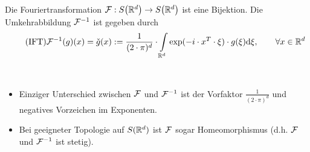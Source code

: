 \begin{theorem}\label{theorem7.4InversionDerFourierTransformation}\enter
	Die Fouriertransformation $\mathcal{F}:S\big(\mathbb{R}^d\big)\to S\big(\mathbb{R}^d\big)$ ist eine Bijektion. Die Umkehrabbildung $\mathcal{F}^{-1}$ ist gegeben durch
	\begin{align}\label{eqTheorem7.4}\tag{IFT}
		\mathcal{F}^{-1}(g)(x)=\check{g}(x):=\frac{1}{(2\cdot\pi)^d}\cdot\int\limits_{\mathbb{R}^d}\exp(-i\cdot x^T\cdot\xi)\cdot g(\xi)\mathrm{d} \xi,\qquad\forall x\in\mathbb{R}^d
	\end{align}
\end{theorem}

\begin{bemerkung}\
	\begin{itemize}
		\item Einziger Unterschied zwischen $\mathcal{F}$ und $\mathcal{F}^{-1}$ ist der Vorfaktor $\frac{1}{(2\cdot\pi)^d}$ und negatives Vorzeichen im Exponenten.
		\item Bei geeigneter Topologie auf $S(\mathbb{R}^d)$ ist $\mathcal{F}$ sogar Homeomorphismus (d.h. $\mathcal{F}$ und $\mathcal{F}^{-1}$ ist stetig).
	\end{itemize}
\end{bemerkung}


